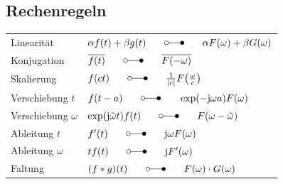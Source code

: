 \documentclass[6pt,a4paper]{scrartcl}
\newcommand{\abs}[1]{\ensuremath{\left\vert#1\right\vert}} 						%
\newcommand{\ma}[1]{\ensuremath{\utilde{\boldsymbol {#1}}}}						%
\newcommand{\bdot}{\ensuremath{\boldsymbol \cdot}} 								%
\let\oldlaplace = \laplace
\renewcommand{\vec}[1]{\ensuremath{\underline{\boldsymbol {#1}}}}
\renewcommand{\i}{\ensuremath{\mathrm{j}}}										%
\newcommand{\ol}[1]{\ensuremath{\overline{#1}}}									%
\newcommand{\Ra}[0]{\ensuremath{\Rightarrow}}									%
\renewcommand{\laplace}{\ \; \oldlaplace \ \;}
\begin{document}
\begin{multicols}{4}
%	
%	
%	
%	
	
	\subsection{Rechenregeln}
	\begin{tabular}{ll}
			Linearität & $\alpha f(t) + \beta g(t) \laplace \alpha F(\omega) + \beta G(\omega)$\\
		Konjugation & $\ol{f(t)} \laplace \ol{F(-\omega)}$\\
		Skalierung & $f(ct) \laplace \frac{1}{\abs{c}} F\bigl(\frac{\omega}{c}\bigr)$\\
		Verschiebung $t$ & $f(t-a) \laplace \exp(- \i \omega a) F(\omega)$\\
		Verschiebung $\omega$ & $\exp(\i \tilde \omega t) f(t) \laplace F(\omega - \tilde \omega)$\\
		Ableitung $t$ & $f'(t) \laplace \i \omega F(\omega)$\\
		Ableitung $\omega$ & $t f(t) \laplace \i F'(\omega)$\\
		Faltung & $(f * g)(t) \laplace F(\omega) \cdot G(\omega)$\\
	\end{tabular}
	

\end{multicols}
\end{document}
